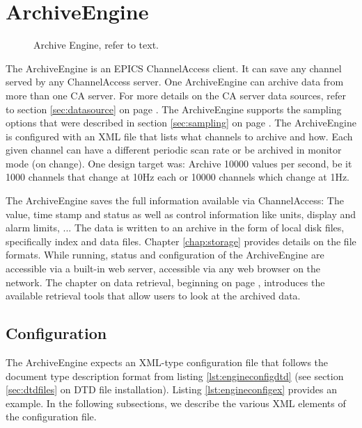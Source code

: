 \chapter{ArchiveEngine}

\begin{figure}[htb]
\begin{center}
\end{center}
\caption{\label{fig:engine}Archive Engine, refer to text.}
\end{figure}

\noindent The ArchiveEngine is an EPICS ChannelAccess client. It can
save any channel served by any ChannelAccess server. One ArchiveEngine
can archive data from more than one CA server. For more details on the
CA server data sources, refer to section \ref{sec:datasource} on page
\pageref{sec:datasource}.  The ArchiveEngine supports the sampling
options that were described in section \ref{sec:sampling} on page
\pageref{sec:sampling}.  The ArchiveEngine is configured with an XML
file that lists what channels to archive and how. Each given channel
can have a different periodic scan rate or be archived in monitor mode
(on change).  One design target was: Archive 10000 values per second,
be it 1000 channels that change at 10Hz each or 10000 channels which
change at 1Hz.

The ArchiveEngine saves the full information available via
ChannelAccess: The value, time stamp and status as well as
control information like units, display and alarm limits, ...  
The data is written to an archive in the form of local disk files,
specifically index and data files.  Chapter \ref{chap:storage}
provides details on the file formats.
While running, status and configuration of the ArchiveEngine are
accessible via a built-in web server, accessible via any web browser
on the network.  The chapter on data retrieval, beginning on page
\pageref{chap:retrieval}, introduces the available retrieval tools
that allow users to look at the archived data.

\section{Configuration}
The ArchiveEngine expects an XML-type configuration file that follows
the document type description format from listing
\ref{lst:engineconfigdtd} (see section \ref{sec:dtdfiles} on DTD file
installation). Listing \ref{lst:engineconfigex} provides an
example. In the following subsections, we describe the various XML
elements of the configuration file.

